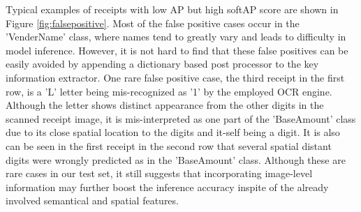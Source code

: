 \documentclass[10pt,twocolumn,letterpaper]{article}
\begin{document}
Typical examples of receipts with low AP but high softAP score are shown in Figure \ref{fig:falsepositive}. Most of the false positive cases occur in the 'VenderName' class, where names tend to greatly vary and leads to difficulty in model inference. However, it is not hard to find that these false positives can be easily avoided by appending a dictionary based post processor to the key information extractor. One rare false positive case, the third receipt in the first row, is a 'L' letter being mis-recognized as '1' by the employed OCR engine. Although the letter shows distinct appearance from the other digits in the scanned receipt image, it is mis-interpreted as one part of the 'BaseAmount' class due to its close spatial location to the digits and it-self being a digit. It is also can be seen in the first receipt in the second row that several spatial distant digits were wrongly predicted as in the 'BaseAmount' class. Although these are rare cases in our test set, it still suggests that incorporating image-level information may further boost the inference accuracy inspite of the already involved semantical and spatial features. 
\end{document}
